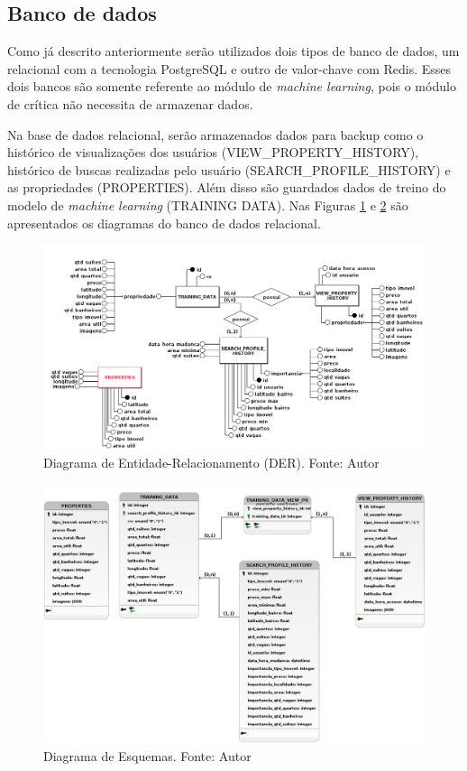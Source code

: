 \subsection{Banco de dados}

Como já descrito anteriormente serão utilizados dois tipos de banco de dados, um relacional com a tecnologia PostgreSQL e outro de valor-chave com Redis. Esses dois bancos são somente referente ao módulo de \textit{machine learning}, pois o módulo de crítica não necessita de armazenar dados.

Na base de dados relacional, serão armazenados dados para backup como o histórico de visualizações dos usuários (VIEW\_PROPERTY\_HISTORY), histórico de buscas realizadas pelo usuário (SEARCH\_PROFILE\_HISTORY) e as propriedades (PROPERTIES). Além disso são guardados dados de treino do modelo de \textit{machine learning} (TRAINING DATA).  Nas Figuras \ref{fig:der} e \ref{fig:diagrama_esquema} são apresentados os diagramas do banco de dados relacional.

\begin{figure}[H]
    \centering
    \includegraphics[scale=0.40]{figuras/proposta/der.png}
    \caption[Diagrama de Entidade-Relacionamento (DER)]{Diagrama de Entidade-Relacionamento (DER). Fonte: Autor}
    \label{fig:der}
\end{figure}

\begin{figure}[H]
    \centering
    \includegraphics[scale=0.40]{figuras/proposta/diagrama_esquema.png}
    \caption[Diagrama de Esquemas]{Diagrama de Esquemas. Fonte: Autor}
    \label{fig:diagrama_esquema}
\end{figure}

